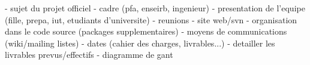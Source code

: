 - sujet du projet officiel
- cadre (pfa, enseirb, ingenieur)
- presentation de l'equipe (fille, prepa, iut, etudiants d'universite)
- reunions
- site web/svn
- organisation dans le code source (packages supplementaires)
- moyens de communications (wiki/mailing listes)
- dates (cahier des charges, livrables...) 
- detailler les livrables prevus/effectifs
- diagramme de gant
